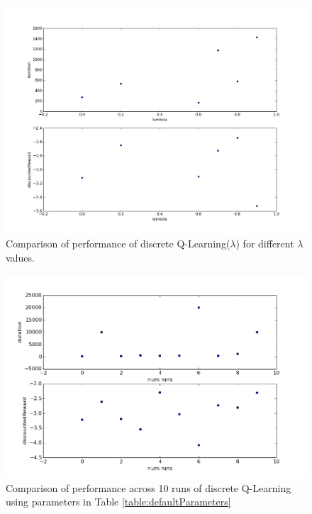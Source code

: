 \documentclass{article}
\begin{document}
\begin{figure}
\centering
\includegraphics[scale=0.5]{figures/discreteQLearningLamComparison.png}
\caption{Comparison of performance of discrete Q-Learning($\lambda$) for different $\lambda$ values.}
\label{figures/discreteQLearningLamComparison.png}
\end{figure}



\begin{figure}
\centering
\includegraphics[scale=0.5]{figures/qlearningMultiple.png}
\caption{Comparison of performance across 10 runs of discrete Q-Learning using parameters in Table \ref{table:defaultParameters}}
\label{figures/qlearningMultiple.png}
\end{figure}
\end{document}
